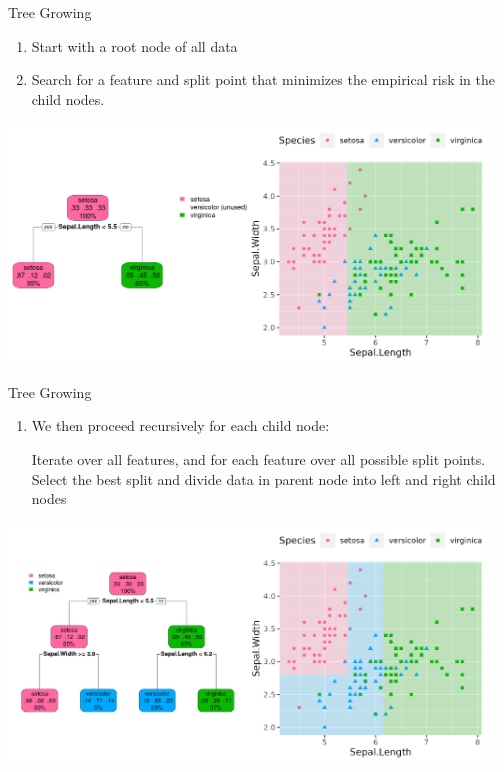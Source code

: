 \documentclass[11pt,compress,t,notes=noshow, xcolor=table]{beamer}
\begin{document}
\begin{vbframe}{Tree Growing}

\begin{enumerate}
\item Start with a root node of all data
\item Search for a feature and split point that minimizes the empirical risk in the child nodes. 
\end{enumerate}

\color{fgcolor}

{\centering \includegraphics[width=0.95\textwidth]{figure/tree-classif-depth1.pdf} 

}

\end{vbframe}

\begin{vbframe}{Tree Growing}

\begin{enumerate}[3]
\item We then proceed recursively for each child node:

Iterate over all features, and for each feature over all possible split points. Select the best split and divide data in parent node into left and right child nodes
\end{enumerate}

\color{fgcolor}

{\centering \includegraphics[width=0.95\textwidth]{figure/tree-classif-depth2.pdf} 

}

\end{vbframe}
\end{document}
